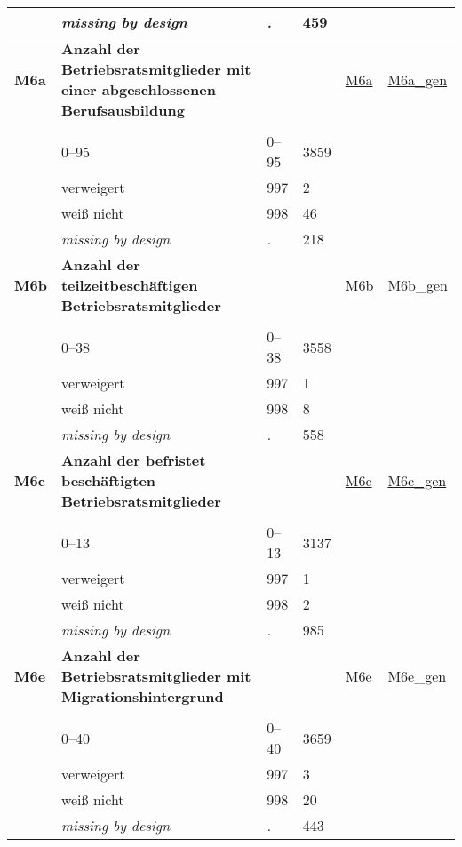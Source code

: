\begin{longtable}{| L{2.45cm} | L{6cm} | C{1.5cm} | R{1cm} | C{2.25cm} | C{2.25cm} |}
   & \textit{missing by design} & \textit{.} & 459 &  &  \\ 
   \midrule
\textbf{M6a}\label{var:M6a} & \textbf{Anzahl der Betriebsratsmitglieder mit einer abgeschlossenen Berufsausbildung} &  &  & \hyperref[M6a]{M6a} & \hyperref[var:suf:M6a:gen]{M6a\_gen} \\ 
   &  &  &  &  &  \\ 
   & 0--95 & 0--95 & 3859 &  &  \\ 
   & verweigert & 997 & 2 &  &  \\ 
   & weiß nicht & 998 & 46 &  &  \\ 
   & \textit{missing by design} & \textit{.} & 218 &  &  \\ 
   \midrule
\textbf{M6b}\label{var:M6b} & \textbf{Anzahl der teilzeitbeschäftigen Betriebsratsmitglieder} &  &  & \hyperref[M6b]{M6b} & \hyperref[var:suf:M6b:gen]{M6b\_gen} \\ 
   &  &  &  &  &  \\ 
   & 0--38 & 0--38 & 3558 &  &  \\ 
   & verweigert & 997 & 1 &  &  \\ 
   & weiß nicht & 998 & 8 &  &  \\ 
   & \textit{missing by design} & \textit{.} & 558 &  &  \\ 
   \midrule
\textbf{M6c}\label{var:M6c} & \textbf{Anzahl der befristet beschäftigten Betriebsratsmitglieder} &  &  & \hyperref[M6c]{M6c} & \hyperref[var:suf:M6c:gen]{M6c\_gen} \\ 
   &  &  &  &  &  \\ 
   & 0--13 & 0--13 & 3137 &  &  \\ 
   & verweigert & 997 & 1 &  &  \\ 
   & weiß nicht & 998 & 2 &  &  \\ 
   & \textit{missing by design} & \textit{.} & 985 &  &  \\ 
   \midrule
\textbf{M6e}\label{var:M6e} & \textbf{Anzahl der Betriebsratsmitglieder mit Migrationshintergrund} &  &  & \hyperref[M6e]{M6e} & \hyperref[var:suf:M6e:gen]{M6e\_gen} \\ 
   &  &  &  &  &  \\ 
   & 0--40 & 0--40 & 3659 &  &  \\ 
   & verweigert & 997 & 3 &  &  \\ 
   & weiß nicht & 998 & 20 &  &  \\ 
   & \textit{missing by design} & \textit{.} & 443 &  &  \\ 

\end{longtable}
